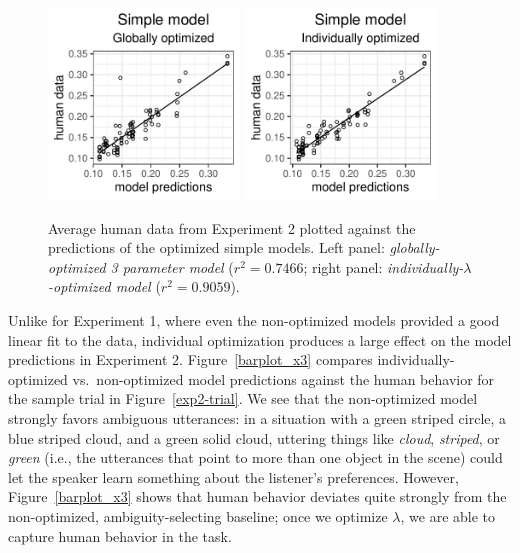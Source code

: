 \documentclass[11pt,a4paper]{article}
\begin{document}
\begin{figure}[ht]
	\centering
	\includegraphics[width=2in]{images/x3_m24.pdf}
	\includegraphics[width=2in]{images/x3_m11.pdf}
	\caption{Average human data from Experiment 2 plotted against the predictions of the optimized simple models.
		Left panel: \emph{globally-optimized 3 parameter model} ($r^{2}=0.7466$;
		right panel: \emph{individually-$\lambda$-optimized model} ($r^{2}=0.9059$). }
	\label{global-individual-x3}
\end{figure}


Unlike for Experiment 1, where even the non-optimized models provided a good linear fit to the data, individual optimization produces a large effect on the model predictions in Experiment 2.
Figure~\ref{barplot_x3} compares individually-optimized vs.~non-optimized model predictions against the human behavior for the sample trial in Figure~\ref{exp2-trial}.
We see that the non-optimized model strongly favors ambiguous utterances: in a situation with a green striped circle, a blue striped cloud, and a green solid cloud, uttering things like \textit{cloud}, \textit{striped}, or \textit{green} (i.e., the utterances that point to more than one object in the scene) could let the speaker learn something about the listener's preferences.
However, Figure~\ref{barplot_x3} shows that human behavior deviates quite strongly from the non-optimized, ambiguity-selecting baseline; once we optimize $\lambda$, we are able to capture human behavior in the task.
\end{document}
